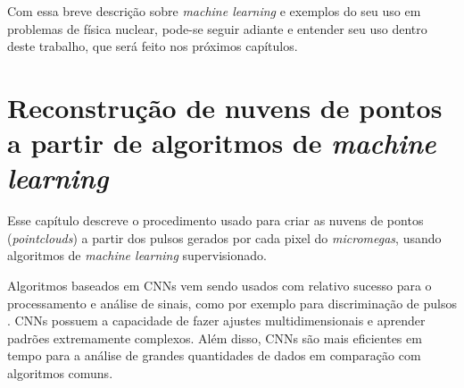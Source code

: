 \documentclass[a4paper,12pt,oneside]{book}
\begin{document}



\par Com essa breve descrição sobre \textit{machine learning} e exemplos do seu uso em problemas de física nuclear, pode-se seguir adiante e entender seu uso dentro deste trabalho, que será feito nos próximos capítulos.

\chapter{Reconstrução de nuvens de pontos a partir de algoritmos de \textit{machine learning}}\label{chapter:sinais}

\par Esse capítulo descreve o procedimento usado para criar as nuvens de pontos (\textit{pointclouds}) a partir dos pulsos gerados por cada pixel do \textit{micromegas}, usando algoritmos de \textit{machine learning} supervisionado.

\par Algoritmos baseados em CNNs vem sendo usados com relativo sucesso para o processamento e análise de sinais\cite{FORTINO2022166497}, como por exemplo para discriminação de pulsos \cite{Holl2019}. CNNs possuem a capacidade de fazer ajustes multidimensionais e aprender padrões extremamente complexos. Além disso, CNNs são mais eficientes em tempo para a análise de grandes quantidades de dados em comparação com algoritmos comuns\cite{FORTINO2022166497}.
\end{document}
